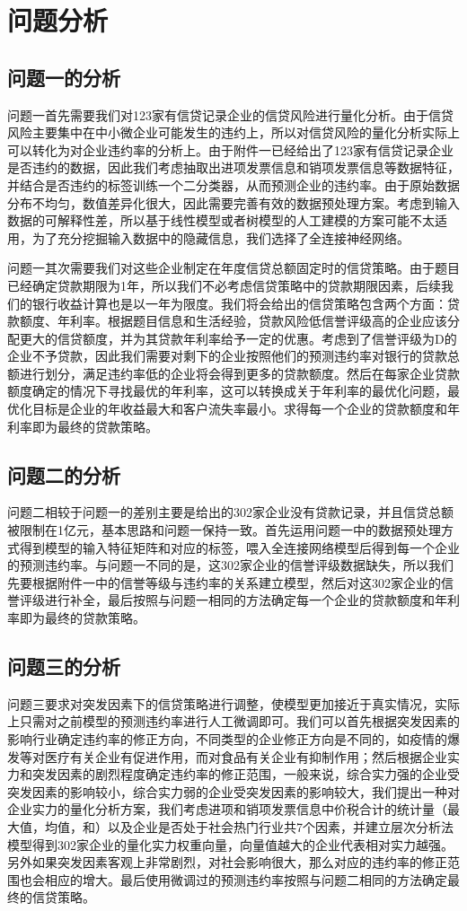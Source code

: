 \documentclass{cumcmthesis}
\begin{document}
\section{问题分析}
\subsection{问题一的分析}
问题一首先需要我们对123家有信贷记录企业的信贷风险进行量化分析。由于信贷风险主要集中在中小微企业可能发生的违约上，所以对信贷风险的量化分析实际上可以转化为对企业违约率的分析上。由于附件一已经给出了123家有信贷记录企业是否违约的数据，因此我们考虑抽取出进项发票信息和销项发票信息等数据特征，并结合是否违约的标签训练一个二分类器，从而预测企业的违约率。由于原始数据分布不均匀，数值差异化很大，因此需要完善有效的数据预处理方案。考虑到输入数据的可解释性差，所以基于线性模型或者树模型的人工建模的方案可能不太适用，为了充分挖掘输入数据中的隐藏信息，我们选择了全连接神经网络。

问题一其次需要我们对这些企业制定在年度信贷总额固定时的信贷策略。由于题目已经确定贷款期限为1年，所以我们不必考虑信贷策略中的贷款期限因素，后续我们的银行收益计算也是以一年为限度。我们将会给出的信贷策略包含两个方面：贷款额度、年利率。根据题目信息和生活经验，贷款风险低信誉评级高的企业应该分配更大的信贷额度，并为其贷款年利率给予一定的优惠。考虑到了信誉评级为D的企业不予贷款，因此我们需要对剩下的企业按照他们的预测违约率对银行的贷款总额进行划分，满足违约率低的企业将会得到更多的贷款额度。然后在每家企业贷款额度确定的情况下寻找最优的年利率，这可以转换成关于年利率的最优化问题，最优化目标是企业的年收益最大和客户流失率最小。求得每一个企业的贷款额度和年利率即为最终的贷款策略。

\subsection{问题二的分析}
问题二相较于问题一的差别主要是给出的302家企业没有贷款记录，并且信贷总额被限制在1亿元，基本思路和问题一保持一致。首先运用问题一中的数据预处理方式得到模型的输入特征矩阵和对应的标签，喂入全连接网络模型后得到每一个企业的预测违约率。与问题一不同的是，这302家企业的信誉评级数据缺失，所以我们先要根据附件一中的信誉等级与违约率的关系建立模型，然后对这302家企业的信誉评级进行补全，最后按照与问题一相同的方法确定每一个企业的贷款额度和年利率即为最终的贷款策略。
\subsection{问题三的分析}


问题三要求对突发因素下的信贷策略进行调整，使模型更加接近于真实情况，实际上只需对之前模型的预测违约率进行人工微调即可。我们可以首先根据突发因素的影响行业确定违约率的修正方向，不同类型的企业修正方向是不同的，如疫情的爆发等对医疗有关企业有促进作用，而对食品有关企业有抑制作用；然后根据企业实力和突发因素的剧烈程度确定违约率的修正范围，一般来说，综合实力强的企业受突发因素的影响较小，综合实力弱的企业受突发因素的影响较大，我们提出一种对企业实力的量化分析方案，我们考虑进项和销项发票信息中价税合计的统计量（最大值，均值，和）以及企业是否处于社会热门行业共7个因素，并建立层次分析法模型得到302家企业的量化实力权重向量，向量值越大的企业代表相对实力越强。另外如果突发因素客观上非常剧烈，对社会影响很大，那么对应的违约率的修正范围也会相应的增大。最后使用微调过的预测违约率按照与问题二相同的方法确定最终的信贷策略。
\end{document}
